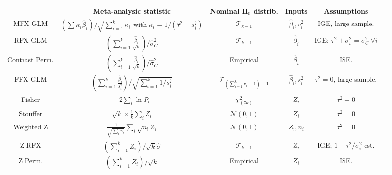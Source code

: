 \documentclass[preprint]{elsarticle}
\newcommand{\effectvector}{\hat\beta}
\newcommand{\effect}[1][i]{\effectvector_{#1}}
\newcommand{\vareffect}[1][i]{s^2_{#1}}
\newcommand{\zeffect}[1][\studyidx]{Z_{#1}}
\newcommand{\peffect}[1][\studyidx]{P_{#1}}
\newcommand{\nStudies}{k}
\newcommand{\studyidx}{i}
\newcommand{\varCombined}{\sigma^2_{C}}
\newcommand{\varBetween}{\tau^2}
\newcommand{\estvarBetween}{\hat\tau^2}
\newcommand{\nSubjects}[1][i]{n_{#1}}
\newcommand{\varWithin}[1][i]{\sigma^2_{#1}}
\newcommand{\IGE}{IGE}
\newcommand{\ISE}{ISE}
\begin{document}
\begin{table*}[t]
\begin{center}
\setlength{\tabcolsep}{3pt}
\begin{tabular}{cccccl}
				& Meta-analysic statistic			& Nominal H$_0$ distrib. & Inputs &  Assumptions\\
\hline						
MFX GLM 		& $ \left( \sum \kappa_i \effect \right) / \sqrt{\sum_{i=1}^\nStudies \kappa_i}$ with $\kappa_i = 1/(\estvarBetween + \vareffect)$ & $\mathcal{T}_{\nStudies - 1}$ & $\effect, \vareffect$& IGE, large sample.\\
RFX GLM 		& $  \left( \sum_{i=1}^\nStudies \frac{\effect}{\sqrt{\nStudies} } \right) / \widehat\varCombined  $ & $\mathcal{T}_{\nStudies - 1}$ & $\effect$ & IGE; $\varBetween+\varWithin = \varCombined\; \forall i$ \\
Contrast Perm.	& $ \left( \sum_{i=1}^\nStudies \frac{\effect}{\sqrt{\nStudies}} \right) /\widehat\varCombined  $ & Empirical & $\effect$ & ISE.\\
FFX GLM 		& $  \left(  \sum_{i=1}^{\nStudies}  \frac{\effect}{\vareffect} \right) / \sqrt{\sum_{i=1}^\nStudies 1/\vareffect } $ & $\mathcal{T}_{ (\sum_{i=1}^\nStudies n_i - 1) - 1}$ & $\effect, \vareffect$ 
& $\varBetween=0$, large sample.\\
Fisher	& $ \displaystyle -2 \sum_{\studyidx} \ln \peffect $ & $\chi^2_{(2\nStudies)}$ & $\zeffect$ & $\varBetween=0$\\
Stouffer& $ \displaystyle \sqrt{\nStudies} \times \frac{1}{\nStudies} \sum_{\studyidx} \zeffect $ & $\mathcal{N}(0,1)$ & $\zeffect$& $\varBetween=0$\\
Weighted Z& $  \displaystyle \frac{1}{\sqrt{\sum_{\studyidx} n_\studyidx}} \sum_{\studyidx}  \sqrt{n_\studyidx} \zeffect  $ & $\mathcal{N}(0,1)$ & $\zeffect, \nSubjects$ & $\varBetween=0$\\
Z RFX& $ \left(   \sum_{i=1}^\nStudies \zeffect \right)/ \sqrt{\nStudies} \hat \sigma$ & $\mathcal{T}_{\nStudies-1}$ & $\zeffect$& IGE; $1 + \varBetween/\varWithin$ cst.\\
Z Perm.	& $\left(  \sum_{i=1}^\nStudies \zeffect \right) / \sqrt{\nStudies}$ & Empirical & $\zeffect$ & ISE.\\
\hline 

\end{tabular}
\end{center}
\caption{Statistics for one-sample meta-analysis tests and their sampling distributions under the null hypothesis $H_0$. Empirical null distributions are determined using permutations with sign flipping. \IGE=Independent Gaussian Errors, \ISE=Independent Symmetric Errors. Note: $\peffect = \Phi(-\zeffect)$, $\widehat\varCombined$ is the unbiased sample variance.}
\label{table:stats_test1}
\end{table*}	
\end{document}

